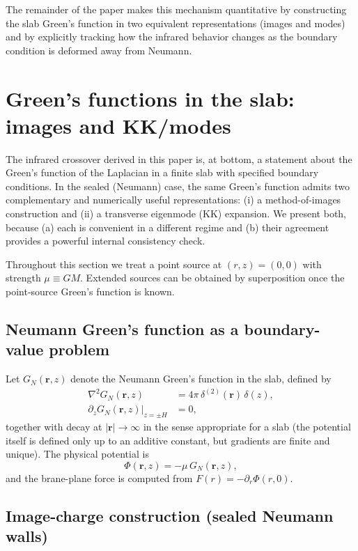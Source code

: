 \documentclass[11pt]{article}
\begin{document}
The remainder of the paper makes this mechanism quantitative by constructing the slab Green's
function in two equivalent representations (images and modes) and by explicitly tracking how the
infrared behavior changes as the boundary condition is deformed away from Neumann.

\section{Green's functions in the slab: images and KK/modes}
\label{sec:greens}

The infrared crossover derived in this paper is, at bottom, a statement about the Green's function of
the Laplacian in a finite slab with specified boundary conditions.  In the sealed (Neumann) case, the
same Green's function admits two complementary and numerically useful representations:
(i) a method-of-images construction and (ii) a transverse eigenmode (KK) expansion.  We present both,
because (a) each is convenient in a different regime and (b) their agreement provides a powerful
internal consistency check.

Throughout this section we treat a point source at $(r,z)=(0,0)$ with strength $\mu\equiv GM$.
Extended sources can be obtained by superposition once the point-source Green's function is known.

\subsection{Neumann Green's function as a boundary-value problem}
Let $G_N(\mathbf{r},z)$ denote the Neumann Green's function in the slab, defined by
\begin{align}
  \nabla^2 G_N(\mathbf{r},z) &= 4\pi\,\delta^{(2)}(\mathbf{r})\,\delta(z),
  \label{eq:GN_def}\\
  \partial_z G_N(\mathbf{r},z)\big|_{z=\pm H} &= 0,
  \label{eq:GN_neumannBC}
\end{align}
together with decay at $|\mathbf{r}|\to\infty$ in the sense appropriate for a slab (the potential
itself is defined only up to an additive constant, but gradients are finite and unique).
The physical potential is
\begin{equation}
  \Phi(\mathbf{r},z) = -\mu\,G_N(\mathbf{r},z),
\end{equation}
and the brane-plane force is computed from $F(r)=-\partial_r\Phi(r,0)$.

\subsection{Image-charge construction (sealed Neumann walls)}
\label{sec:images}
\end{document}

